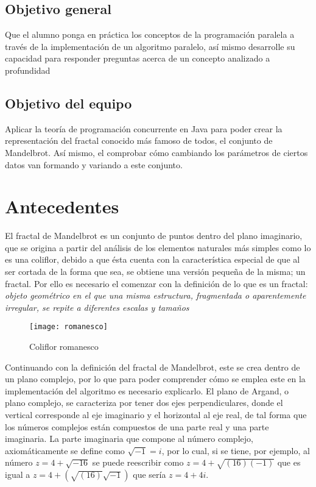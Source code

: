 \documentclass[12pt,a4paper]{article}
\begin{document}
		\subsection{Objetivo general}
			Que el alumno ponga en práctica los conceptos de la programación paralela a través de la implementación de un algoritmo paralelo, así mismo desarrolle su capacidad para responder preguntas acerca de un concepto analizado a profundidad
		\subsection{Objetivo del equipo}
			Aplicar la teoría de programación concurrente en Java para poder crear la representación del fractal conocido más famoso de todos, el conjunto de Mandelbrot. Así mismo, el comprobar cómo cambiando los parámetros de ciertos datos van formando y variando a este conjunto.
	
	\section{Antecedentes}
		El fractal de Mandelbrot es un conjunto de puntos dentro del plano imaginario, que se origina a partir del análisis de los elementos naturales más simples como lo es una coliflor, debido a que ésta cuenta con la característica especial de que al ser cortada de la forma que sea, se obtiene una versión pequeña de la misma; un fractal. Por ello es necesario el comenzar con la definición de lo que es un fractal: \textit{objeto geométrico en el que una misma estructura, fragmentada o aparentemente irregular, se repite a diferentes escalas y tamaños}
		
		\begin{figure}[h]
			\centering
			\texttt{[image: romanesco]}
			\caption{Coliflor romanesco}
		\end{figure}
				
		Continuando con la definición del fractal de Mandelbrot, este se crea dentro de un plano complejo, por lo que para poder comprender cómo se emplea este en la implementación del algoritmo es necesario explicarlo. El plano de Argand, o plano complejo, se caracteriza por tener dos ejes perpendiculares, donde el vertical corresponde al eje imaginario y el horizontal  al eje real, de tal forma que los números complejos están compuestos de una parte real y una parte imaginaria. La parte imaginaria que compone al número complejo, axiomáticamente se define como $\sqrt{-1} = i$, por lo cual, si se tiene, por ejemplo, al número $z = 4 + \sqrt{-16}$ se puede reescribir como $z = 4 + \sqrt{(16)(-1)}$ que es igual a $z = 4 + (\sqrt{(16)}\sqrt{-1})$ que sería $z = 4 + 4i$.
				
\end{document}
